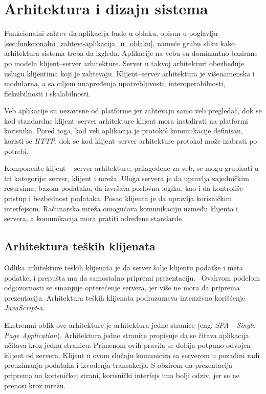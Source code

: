 \chapter{Arhitektura i dizajn sistema}\label{ch:arhitektura}

Funkcionalni zahtev da aplikacija bude u oblaku, opisan u poglavlju 
\ref{sec:funkcionalni_zahtevi-aplikacija_u_oblaku}, nameće grubu sliku kako arhitektura sistema 
treba da izgleda. Aplikacije na vebu su dominantno bazirane po modelu klijent--server arhitekture. 
Server u takvoj arhitekturi obezbeđuje uslugu klijentima koji je zahtevaju. Klijent--server 
arhitektura je višenamenska i modularna, a sa ciljem unapređenja upotrebljivosti, interoperabilnosti, 
fleksibilnosti i skalabilnosti. 

Veb aplikacije su nezavisne od platforme jer zahtevaju samo veb pregledač, dok se kod standardne 
klijent--server arhitekture klijent mora instalirati na platformi korisnika. Pored toga, 
kod veb aplikacija je protokol komunikacije definisan, koristi se \textit{HTTP}, dok se kod klijent--server
arhitekture protokol može izabrati po potrebi.

Komponente klijent -- server arhitekture, prilagođene za veb, se mogu grupisati u tri kategorije: 
server, klijent i mreža. Uloga servera je da upravlja zajedničkim resursima, bazom podataka, da 
izvršava poslovnu logiku, kao i da kontroliše pristup i bezbednost podataka. Posao klijenta je da 
upravlja korisničkim interfejsom. Računarska mreža omogućava komunikaciju uzmeđu klijenta i servera, 
a komunikacija mora pratiti određene standarde.

\section{Arhitektura teških klijenata}\label{sec:arhitektura-spa}

Odlika arhitekture teških klijenata je da server šalje klijentu podatke i meta podatke, i prepušta 
mu da samostalno pripremi prezentaciju.~\cite{PVEB} Ovakvom podelom odgovornosti se smanjuje opterećenje 
servera, jer više ne mora da priprema prezentaciju. Arhitektura teških klijenata podrazumeva intenzivno 
korišćenje \textit{JavaScript}-a.

Ekstremni oblik ove arhitekture je arhitektura jedne stranice (eng. \textit{SPA - Single Page Application}).
Arhitektura jedne stranice propisuje da se čitava aplikacija učitava kroz jednu stranicu. Primenom 
ovih pravila se dobija potpuno odvojen klijent od servera. Klijent u ovom slučaju komunicira 
sa serverom u pozadini radi preuzimanja podataka i izvođenja transakcija. S obzirom da prezentacija
priprema na korisničkoj strani, korisnički interfejs ima bolji odziv, jer se ne prenosi kroz mrežu.

